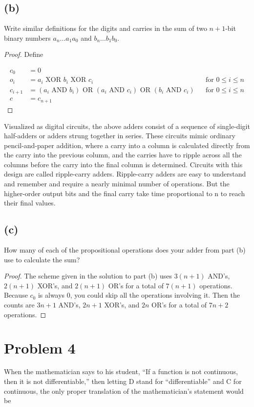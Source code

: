 \documentclass[14pt]{extarticle}
\begin{document}
\subsection{(b)}
Write similar definitions for the digits and carries in the sum of two $n+1$-bit binary numbers $a_n \ldots a_1 a_0$ and $b_n \ldots b_1 b_0$.
\begin{proof}
Define

\begin{align*}
c_0 & = 0 & &\\
o_i & = a_i \text{ XOR } b_i \text{ XOR } c_i & & \text{for } 0 \leq i \leq n\\
c_{i+1} & = (a_i \text{ AND } b_i) \text{ OR } (a_i \text{ AND } c_i) \text{ OR } (b_i \text{ AND } c_i) & & \text{for } 0 \leq i \leq n\\
c & =  c_{n+1} & &
\end{align*}
\end{proof}

Visualized as digital circuits, the above adders consist of a sequence of single-digit half-adders or adders strung together in series. These circuits mimic ordinary pencil-and-paper addition, where a carry into a column is calculated directly from the carry into the previous column, and the carries have to ripple across all the columns before the carry into the final column is determined. Circuits with this design are called ripple-carry adders. Ripple-carry adders are easy to understand and remember and require a nearly minimal number of operations. But the higher-order output bits and the final carry take time proportional to n to reach their final values.
\subsection{(c)}
How many of each of the propositional operations does your adder from part (b) use to calculate the sum?
\begin{proof}
The scheme given in the solution to part (b) uses $3(n + 1)$ AND’s, $2(n + 1)$ XOR’s, and $2(n + 1)$ OR’s for a total of $7(n + 1)$ operations. Because $c_0$ is always 0, you could skip all the operations involving it. Then the counts are $3n + 1$ AND’s, $2n + 1$ XOR’s, and $2n$ OR’s for a total of $7n + 2$ operations.
\end{proof}

\section{Problem 4}
When the mathematician says to his student, “If a function is not continuous, then it is not differentiable,” then letting D stand for “differentiable” and C for continuous, the only proper translation of the mathematician’s statement would be
\end{document}
